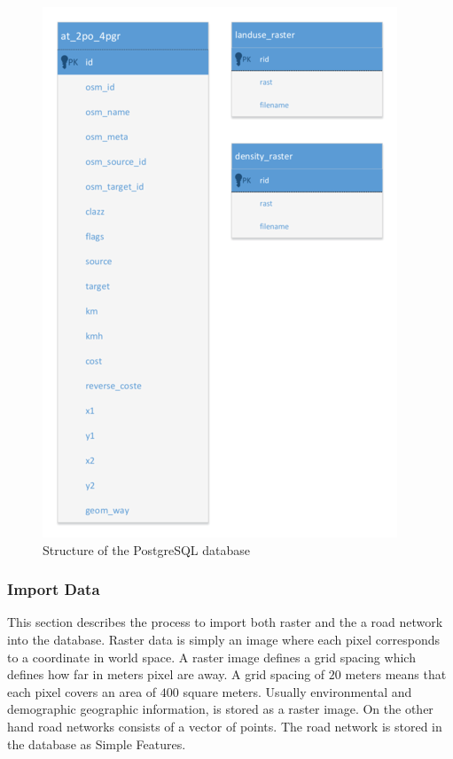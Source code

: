 \documentclass[master,english]{hgbthesis}
\begin{document}
\begin{figure}

\centering

\includegraphics[width=0.7\linewidth]{./images/pg_structure.png}

\caption{Structure of the PostgreSQL database}

\label{fig:pg_structure}

\end{figure}

\subsubsection{Import Data}

This section describes the process to import both raster and the a road network into the database. Raster data is simply an image where each pixel corresponds to a coordinate in world space. A raster image defines a grid spacing which defines how far in meters pixel are away. A grid spacing of $20$ meters means that each pixel covers an area of $400$ square meters. Usually environmental and demographic geographic information, is stored as a raster image. On the other hand road networks consists of a vector of points. The road network is stored in the database as Simple Features.
\end{document}
